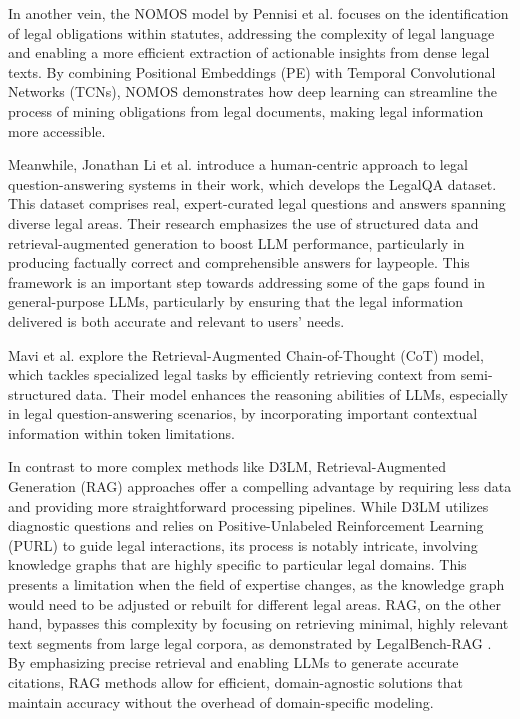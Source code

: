 In another vein, the NOMOS model by Pennisi et al. \cite{pennisi-etal-2023-nomos} 
focuses on the identification of legal obligations within statutes, addressing the 
complexity of legal language and enabling a more efficient extraction of actionable 
insights from dense legal texts. By combining Positional Embeddings (PE) with 
Temporal Convolutional Networks (TCNs), NOMOS demonstrates how deep learning can 
streamline the process of mining obligations from legal documents, 
making legal information more accessible.

Meanwhile, Jonathan Li et al. \cite{li2024experimentinglegalaisolutions} introduce a 
human-centric approach to legal question-answering systems in their work, which 
develops the LegalQA dataset. This dataset comprises real, expert-curated legal 
questions and answers spanning diverse legal areas. Their research emphasizes the 
use of structured data and retrieval-augmented generation to boost LLM performance, 
particularly in producing factually correct and comprehensible answers for laypeople. 
This framework is an important step towards addressing some of the gaps found in general-purpose LLMs, 
particularly by ensuring that the legal information delivered is both accurate and relevant to users' needs.

Mavi et al. \cite{mavi2023retrievalaugmentedchainofthoughtsemistructureddomains} 
explore the Retrieval-Augmented Chain-of-Thought (CoT) model, 
which tackles specialized legal tasks by efficiently retrieving 
context from semi-structured data. Their model enhances the reasoning abilities of LLMs, 
especially in legal question-answering scenarios, by incorporating important contextual 
information within token limitations.

In contrast to more complex methods like D3LM, Retrieval-Augmented Generation (RAG) 
approaches offer a compelling advantage by requiring less data and providing more 
straightforward processing pipelines. While D3LM utilizes diagnostic questions and 
relies on Positive-Unlabeled Reinforcement Learning (PURL) to guide legal interactions, 
its process is notably intricate, involving knowledge graphs that are highly specific to 
particular legal domains. This presents a limitation when the field of expertise changes, 
as the knowledge graph would need to be adjusted or rebuilt for different legal areas. 
RAG, on the other hand, bypasses this complexity by focusing on retrieving minimal, 
highly relevant text segments from large legal corpora, as demonstrated by 
LegalBench-RAG \cite{pipitone2024legalbenchragbenchmarkretrievalaugmentedgeneration}. 
By emphasizing precise retrieval and enabling LLMs to generate accurate citations, 
RAG methods allow for efficient, domain-agnostic solutions that maintain accuracy 
without the overhead of domain-specific modeling.

